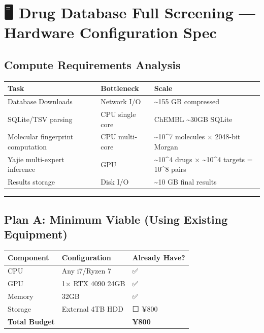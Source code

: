 \documentclass[
  12pt,
]{article}
\author{SCX}
\date{2026}
\begin{document}
\section{🖥️ Drug Database Full Screening --- Hardware Configuration Spec}\label{drug-database-full-screening-hardware-configuration-spec}

\subsection{Compute Requirements Analysis}\label{compute-requirements-analysis}

\begin{longtable}[]{@{}lll@{}}
\toprule\noalign{}
Task & Bottleneck & Scale \\
\midrule\noalign{}
\endhead
\bottomrule\noalign{}
\endlastfoot
12 Database Downloads & Network I/O & \textasciitilde155 GB compressed \\
SQLite/TSV parsing & CPU single core & ChEMBL \textasciitilde30GB SQLite \\
Molecular fingerprint computation & CPU multi-core & \textasciitilde10\^{}7 molecules × 2048-bit Morgan \\
Yajie multi-expert inference & GPU & \textasciitilde10\^{}4 drugs × \textasciitilde10\^{}4 targets = 10\^{}8 pairs \\
Results storage & Disk I/O & \textasciitilde10 GB final results \\
\end{longtable}

\begin{center}\rule{0.5\linewidth}{0.5pt}\end{center}

\subsection{Plan A: Minimum Viable (Using Existing Equipment)}\label{plan-a-minimum-viable-using-existing-equipment}

\begin{longtable}[]{@{}lll@{}}
\toprule\noalign{}
Component & Configuration & Already Have? \\
\midrule\noalign{}
\endhead
\bottomrule\noalign{}
\endlastfoot
CPU & Any i7/Ryzen 7 & ✅ \\
GPU & 1× RTX 4090 24GB & ✅ \\
Memory & 32GB & ✅ \\
Storage & External 4TB HDD & ⬜ ¥800 \\
\textbf{Total Budget} & & \textbf{¥800} \\
\end{longtable}
\end{document}
